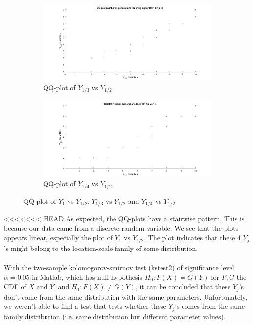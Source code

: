 \begin{figure}[H]
    \begin{subfigure}{0.8\textwidth}
    \includegraphics[width=\textwidth]{QQplotATGEN1.pdf}
    \caption{QQ-plot of $Y_{1/3}$ vs $Y_{1/2}$}
        \label{fig:QQplotATGEN1}
    \end{subfigure}
    \begin{subfigure}{0.8\textwidth}
    \includegraphics[width=\textwidth]{QQplotATGEN2.pdf}
    \caption{QQ-plot of $Y_{1/4}$ vs $Y_{1/2}$}
        \label{fig:QQplotATGEN2}
    \end{subfigure}
    \caption{QQ-plot of $Y_{1}$ vs $Y_{1/2}$, $Y_{1/3}$ vs $Y_{1/2}$ and $Y_{1/4}$ vs $Y_{1/2}$}
    \label{fig:QQ-plot}
\end{figure}
<<<<<<< HEAD
As expected, the QQ-plots have a stairwise pattern. This is because our data came from a discrete random variable. We see that the plots appears linear, especially the plot of $Y_{1}$ vs $Y_{1/2}$. The plot indicates that these 4 $Y_j$'s might belong to the location-scale family of some distribution.\\
\\
With the two-sample kolomogorov-smirnov test (kstest2) of significance level $\alpha=0.05$ in Matlab, which has null-hypothesis $H_0:F(X)=G(Y)$ for $F,G$ the CDF of $X$ and $Y$, and $H_1: F(X)\neq G(Y)$, it can be concluded that these $Y_j$'s don't come from the same distribution with the same parameters. Unfortunately, we weren't able to find a test that tests whether these $Y_j$'s comes from the same family distribution (i.e. same distribution but different parameter values).\\
